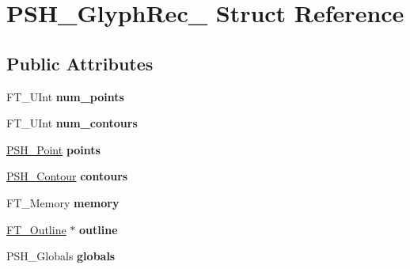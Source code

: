 \hypertarget{struct_p_s_h___glyph_rec__}{}\section{P\+S\+H\+\_\+\+Glyph\+Rec\+\_\+ Struct Reference}
\label{struct_p_s_h___glyph_rec__}
\subsection*{Public Attributes}
\begin{DoxyCompactItemize}
\item 
\mbox{\label{struct_p_s_h___glyph_rec___a696eb2226c5aa1c55ab162f725a7c9b7}} 
F\+T\+\_\+\+U\+Int {\bfseries num\+\_\+points}
\item 
\mbox{\label{struct_p_s_h___glyph_rec___a742cca21d75380d3b3c6589f2e69aec4}} 
F\+T\+\_\+\+U\+Int {\bfseries num\+\_\+contours}
\item 
\mbox{\label{struct_p_s_h___glyph_rec___a1e4872d9c2286dafb261a1398152674a}} 
\hyperlink{struct_p_s_h___point_rec__}{P\+S\+H\+\_\+\+Point} {\bfseries points}
\item 
\mbox{\label{struct_p_s_h___glyph_rec___ade9e594cd9ede3162787b2be47e5b719}} 
\hyperlink{struct_p_s_h___contour_rec__}{P\+S\+H\+\_\+\+Contour} {\bfseries contours}
\item 
\mbox{\label{struct_p_s_h___glyph_rec___a303af9b985cdd171dc2eb9121ba8f2a2}} 
F\+T\+\_\+\+Memory {\bfseries memory}
\item 
\mbox{\label{struct_p_s_h___glyph_rec___a8c015e611027f9066a151443f2fc3ef0}} 
\hyperlink{struct_f_t___outline__}{F\+T\+\_\+\+Outline} $\ast$ {\bfseries outline}
\item 
\mbox{\label{struct_p_s_h___glyph_rec___ae0ee8eeafcdf9c301b1b2d38b50a04e1}} 
P\+S\+H\+\_\+\+Globals {\bfseries globals}
\item 
\mbox{\label{struct_p_s_h___glyph_rec___ae46b190c2bdf88f967078b11b8c05153}} 

\end{DoxyCompactItemize}
